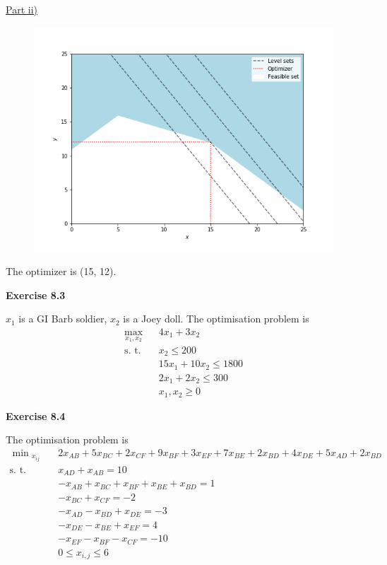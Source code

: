 \documentclass[letterpaper,12pt]{article}
\begin{document}
\underline{Part ii)}
\begin{figure}[H]
	\centering
	\includegraphics[scale=0.45]{plot3.png}
	\label{plot1}
\end{figure}
The optimizer is (15, 12).

\textbf{Exercise 8.3}

$x_1$ is a GI Barb soldier, $x_2$ is a Joey doll. The optimisation problem is
\begin{align*}
\max_{x_1, x_2} \ & 4x_1 + 3x_2 \\
\text{s. t.} \quad & x_2 \leq 200 \\
& 15x_1 + 10 x_2 \leq 1800 \\
& 2x_1 + 2x_2 \leq 300 \\
& x_1, x_2 \geq 0
\end{align*}

\textbf{Exercise 8.4}

The optimisation problem is
\begin{align*}
\min{_{x_{ij}}} \quad & 2 x_{AB} + 5 x_{BC} + 2 x_{CF} + 9 x_{BF} + 3 x_{EF} + 7 x_{BE} + 2 x_{BD} + 4 x_{DE} + 5 x_{AD} + 2 x_{BD} \\
\text{s. t.} \quad & x_{AD} + x_{AB} = 10 \\
& -x_{AB} + x_{BC} + x_{BF} + x_{BE} + x_{BD} = 1 \\
& -x_{BC} + x_{CF} = -2 \\
& -x_{AD} - x_{BD} + x_{DE} = -3 \\
& -x_{DE} - x_{BE} + x_{EF} = 4 \\
& -x_{EF} - x_{BF} - x_{CF} = -10 \\
& 0 \leq x_{i, j} \leq 6
\end{align*}
\end{document}
